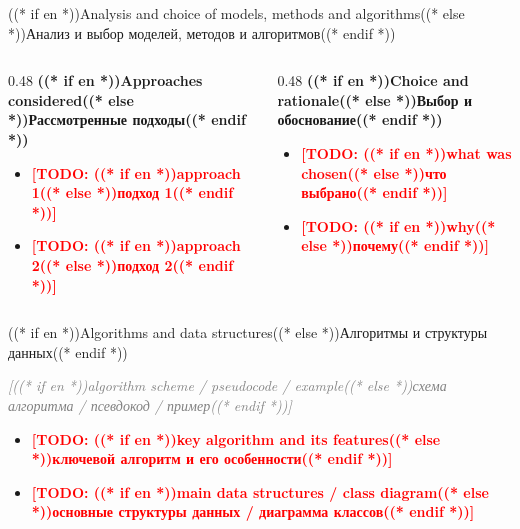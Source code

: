 \documentclass[aspectratio=169, 14pt]{beamer}
\newcommand{\todo}[1]{\textcolor{red}{\textbf{[TODO: #1]}}}
\begin{document}
\begin{frame}{((* if en *))Analysis and choice of models, methods and algorithms((* else *))Анализ и выбор моделей, методов и алгоритмов((* endif *))}
  \begin{columns}[T]
    \begin{column}{0.48\textwidth}
      {\color{hseblue}\textbf{((* if en *))Approaches considered((* else *))Рассмотренные подходы((* endif *))}}
      \begin{itemize}
        \item \todo{((* if en *))approach 1((* else *))подход 1((* endif *))}
        \item \todo{((* if en *))approach 2((* else *))подход 2((* endif *))}
      \end{itemize}
    \end{column}
    \begin{column}{0.48\textwidth}
      {\color{hseblue}\textbf{((* if en *))Choice and rationale((* else *))Выбор и обоснование((* endif *))}}
      \begin{itemize}
        \item \todo{((* if en *))what was chosen((* else *))что выбрано((* endif *))}
        \item \todo{((* if en *))why((* else *))почему((* endif *))}
      \end{itemize}
    \end{column}
  \end{columns}
\end{frame}

\begin{frame}{((* if en *))Algorithms and data structures((* else *))Алгоритмы и структуры данных((* endif *))}
  \begin{center}
    \textcolor{gray}{\itshape [((* if en *))algorithm scheme / pseudocode / example((* else *))схема алгоритма / псевдокод / пример((* endif *))]}
  \end{center}

  \vspace{0.3em}
  \begin{itemize}
    \item \todo{((* if en *))key algorithm and its features((* else *))ключевой алгоритм и его особенности((* endif *))}
    \item \todo{((* if en *))main data structures / class diagram((* else *))основные структуры данных / диаграмма классов((* endif *))}
  \end{itemize}
\end{frame}
\end{document}
